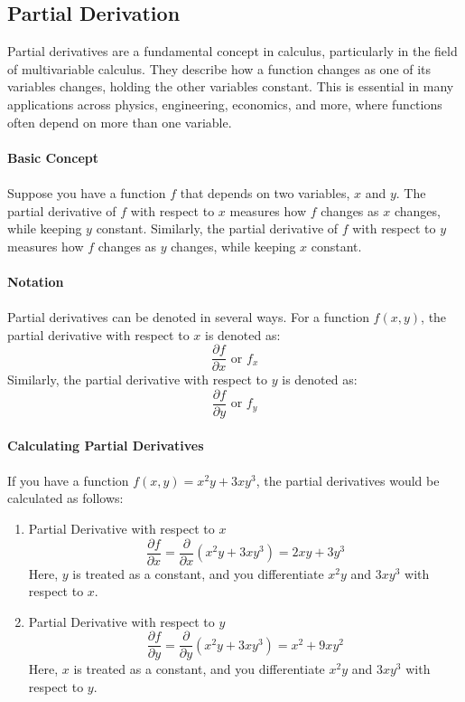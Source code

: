 \documentclass[12pt]{article}
\begin{document}
    \subsection{Partial Derivation}
    Partial derivatives are a fundamental concept in calculus, particularly in
    the field of multivariable calculus. They describe how a function
    changes as one of its variables changes, holding the other variables
    constant. This is essential in many applications across physics,
    engineering, economics, and more, where functions often depend on more
    than one variable.\\
    \\
    \textbf{Basic Concept}\\
    \\
    Suppose you have a function \( f \) that depends on two variables,
    \( x \) and \( y \). The partial derivative of \( f \) with respect
    to \( x \) measures how \( f \) changes as \( x \) changes, while
    keeping \( y \) constant. Similarly, the partial derivative of \( f \)
    with respect to \( y \) measures how \( f \) changes as \( y \) changes,
    while keeping \( x \) constant.\\
    \\
    \textbf{Notation}\\
    \\
    Partial derivatives can be denoted in several ways. For a function \( f(x, y) \),
    the partial derivative with respect to \( x \) is denoted as:
    \begin{equation}
        \frac{\partial f}{\partial x} \text{ or } f_x
    \end{equation}
    Similarly, the partial derivative with respect to \( y \) is denoted as:
    \begin{equation}
        \frac{\partial f}{\partial y} \text{ or } f_y
    \end{equation}
    \\
    \textbf{Calculating Partial Derivatives}\\
    \\
    If you have a function \( f(x, y) = x^2y + 3xy^3 \), the partial derivatives would be
    calculated as follows:\\
    \begin{enumerate}
    \item Partial Derivative with respect to \( x \)
    \begin{equation}
       \frac{\partial f}{\partial x} = \frac{\partial}{\partial x} (x^2y + 3xy^3)
        = 2xy + 3y^3
    \end{equation}
       Here, \( y \) is treated as a constant, and you differentiate \( x^2y \) and \( 3xy^3 \) with respect to \( x \).
    
    \item Partial Derivative with respect to \( y \)
    \begin{equation}
       \frac{\partial f}{\partial y} = \frac{\partial}{\partial y} (x^2y + 3xy^3)
       = x^2 + 9xy^2
    \end{equation}
       Here, \( x \) is treated as a constant, and you differentiate \( x^2y \) and \( 3xy^3 \) with respect to \( y \).
    \end{enumerate}
\end{document}

